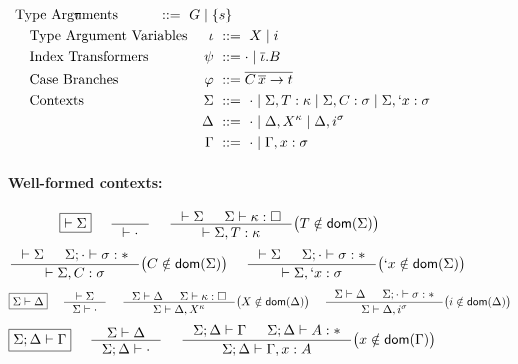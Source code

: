 \begin{figure}
\begin{framed}
\begin{align*}
 \text{Type Arguments}
 \!\!\!\!\!\!\!\!\!\!\!\!\!\!\!\!\!\!\!
	& \tau		&~ ::= ~ G \mid \{s\}
 \!\!\!\! \!\!\!\! \\
&\!\!\!\!\!\!\!\!\!\!\!\!\!\!\!\!\!\!\!
 \text{Type Argument Variables}
 \!\!\!\!\!\!\!\!\!\!\!\!\!\!\!\!\!\!\!
	& \iota		&~ ::= ~ X \mid i
 \!\!\!\! \!\!\!\! \\
&\!\!\!\!\!\!\!\!\!\!\!\!\!\!\!\!\!\!\!
 \text{Index Transformers}
 \!\!\!\!\!\!\!\!\!\!\!\!\!\!\!\!\!\!\!
	& \psi		&~ ::= \cdot \mid \overline\iota . B
 \!\!\!\! \!\!\!\! \\
&\!\!\!\!\!\!\!\!\!\!\!\!\!\!\!\!\!\!\!
 \text{Case Branches}
 \!\!\!\!\!\!\!\!\!\!\!\!\!\!\!\!\!\!\!
	& \varphi	&~ ::= \overline{C\,\overline{x} -> t}
 \!\!\!\! \!\!\!\! \\
&\!\!\!\!\!\!\!\!\!\!\!\!\!\!\!\!\!\!\!
 \text{Contexts}
 \!\!\!\!\!\!\!\!\!\!\!\!\!\!\!\!\!\!\!
	& \Sigma	&~ ::= ~ \cdot
			   \mid \Sigma, T: \kappa
			   \mid \Sigma, C: \sigma
			   \mid \Sigma, `x: \sigma
 \!\!\!\! \!\!\!\! \\
&\!\!\!\!\!\!\!\!\!\!\!\!\!\!\!\!\!\!\!
 \!\!\!\!\!\!\!\!\!\!\!\!\!\!\!\!\!\!\!
	& \Delta	&~ ::= ~ \cdot
			   \mid \Delta, X^\kappa
			   \mid \Delta, i^\sigma
 \!\!\!\! \!\!\!\! \\
&\!\!\!\!\!\!\!\!\!\!\!\!\!\!\!\!\!\!\!
 \!\!\!\!\!\!\!\!\!\!\!\!\!\!\!\!\!\!\!
	& \Gamma	&~ ::= ~ \cdot \mid \Gamma,x:\sigma
 \!\!\!\! \!\!\!\!
\end{align*}

\paragraph{Well-formed contexts:}
\[ \fbox{$|- \Sigma$}
 ~~~~
   \inference{}{|- \cdot}
 ~~~~
   \inference{|- \Sigma & \Sigma |- \kappa:\square}
             {|- \Sigma,T:\kappa}
      \big( T\notin\dom(\Sigma) \big)
\]
\[ \inference{|- \Sigma & \Sigma;\cdot |- \sigma:*}
             {|- \Sigma,C:\sigma}
      \big( C\notin\dom(\Sigma) \big)
 ~~~~
   \inference{|- \Sigma & \Sigma;\cdot |- \sigma:*}
             {|- \Sigma,`x:\sigma}
      \big( `x\notin\dom(\Sigma) \big)
\]
\[ \fbox{$\Sigma|- \Delta$}
 ~~~~
   \inference{|- \Sigma}{\Sigma |- \cdot}
 ~~~~
   \inference{\Sigma |- \Delta & \Sigma |- \kappa:\square}
             {\Sigma |- \Delta,X^\kappa}
      \big( X\notin\dom(\Delta) \big)
 ~~~~ 
   \inference{\Sigma |- \Delta & \Sigma;\cdot |- \sigma:*}
             {\Sigma |- \Delta,i^\sigma}
      \big( i\notin\dom(\Delta) \big)
\]
\[ \fbox{$\Sigma;\Delta |- \Gamma$}
 ~~~~
   \inference{\Sigma |- \Delta}{\Sigma;\Delta |- \cdot}
 ~~~~
   \inference{\Sigma;\Delta |- \Gamma & \Sigma;\Delta |- A:*}
             {\Sigma;\Delta |- \Gamma,x:A}
      \big( x\notin\dom(\Gamma) \big)
\]
~\\


\end{framed}
\end{figure}
